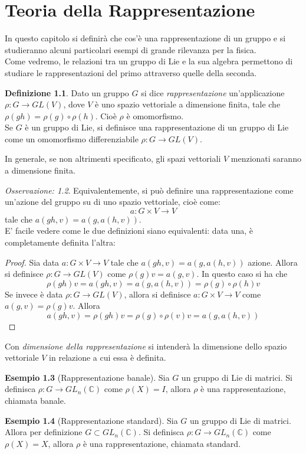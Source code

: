 \documentclass[12pt,a4paper]{report}
\theoremstyle{definition}
\newtheorem{Def}{Definizione}[chapter]
\theoremstyle{definition}
\newtheorem{Ex}[Def]{Esempio}
\theoremstyle{definition}
\theoremstyle{remark}
\newtheorem{Obs}[Def]{Osservazione:}
\begin{document}
\chapter{Teoria della Rappresentazione}
In questo capitolo si definirà che cos'è una rappresentazione di un gruppo e si studieranno alcuni particolari esempi di grande rilevanza per la fisica.\\
Come vedremo, le relazioni tra un gruppo di Lie e la sua algebra permettono di studiare le rappresentazioni del primo attraverso quelle della seconda.
\begin{Def}
Dato un gruppo $G$ si dice \textit{rappresentazione} un'applicazione\\ $\rho:G\rightarrow GL(V)$, dove $V$ è uno spazio vettoriale a dimensione finita, tale che $\rho(gh)=\rho(g)\circ\rho(h)$. Cioè $\rho$ è omomorfismo.\\
Se $G$ è un gruppo di Lie, si definisce una rappresentazione di un gruppo di Lie come un omomorfismo differenziabile $\rho:G\rightarrow GL(V)$.
\end{Def}
In generale, se non altrimenti specificato, gli spazi vettoriali $V$ menzionati saranno a dimensione finita.
\begin{Obs}
	Equivalentemente, si può definire una rappresentazione come un'azione del gruppo su di uno spazio vettoriale, cioè come:
	$$a:G\times V\rightarrow V$$
	tale che $a(gh,v)=a(g,a(h,v))$.\\
	E' facile vedere come le due definizioni siano equivalenti: data una, è completamente definita l'altra:
	\begin{proof}
		Sia data $a:G\times V\rightarrow V$
		tale che $a(gh,v)=a(g,a(h,v))$ azione. Allora si definisce $\rho:G\rightarrow GL(V)$ come $\rho(g)v=a(g,v)$. In questo caso si ha che $$\rho(gh)v=a(gh,v)=a(g,a(h,v))=\rho(g)\circ\rho(h)v$$
		Se invece è data $\rho:G\rightarrow GL(V)$, allora si definisce $a:G\times V\rightarrow V$ come $a(g,v)=\rho(g)v$. Allora $$a(gh,v)=\rho(gh)v=\rho(g)\circ\rho(v)v=a(g,a(h,v))$$
	\end{proof}
\end{Obs}
Con \textit{dimensione della rappresentazione} si intenderà la dimensione dello spazio vettoriale $V$ in relazione a cui essa è definita.
\begin{Ex}[Rappresentazione banale]
	Sia $G$ un gruppo di Lie di matrici. Si definisca $\rho: G\rightarrow GL_n(\mathbb{C})$ come $\rho(X)=I$, allora $\rho$ è una rappresentazione, chiamata banale. 
\end{Ex}
\begin{Ex}[Rappresentazione standard]
	Sia $G$ un gruppo di Lie di matrici. Allora per definizione $G\subset GL_n(\mathbb{C})$. Si definisca $\rho: G\rightarrow GL_n(\mathbb{C})$ come $\rho(X)=X$, allora $\rho$ è una rappresentazione, chiamata standard. 
\end{Ex}
\end{document}
